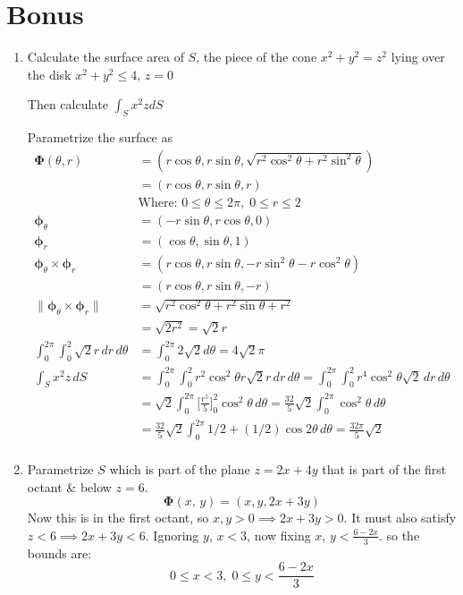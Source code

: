 \documentclass{article}
\newcommand{\norm}[1]{\| #1 \|}
\begin{document}
\section*{Bonus}

\begin{enumerate}[label=(\alph*)]
    \item Calculate the surface area of $S$, the piece of the cone $x^2 + y^2 = z^2$ lying over the disk $x^2 + y^2 \leq 4,\, z=0$
    
    Then calculate $\displaystyle \int_Sx^2zdS$
    
    Parametrize the surface as
    \begin{align*} 
    \boldsymbol \Phi (\theta, r) &= (r\cos \theta, r\sin \theta, \sqrt{r^2\cos^2\theta + r^2\sin^2\theta}) \\
    &= (r\cos \theta, r\sin \theta, r) \\
    &\text{Where: } 0 \leq \theta \leq 2\pi, \; 0 \leq r \leq 2 \\
    \boldsymbol \phi_{\theta} &= (-r\sin \theta, r\cos \theta, 0)\\
    \boldsymbol \phi_{r} &= (\cos \theta, \sin \theta, 1)\\
    \boldsymbol \phi_{\theta} \times \boldsymbol \phi_{r} &= (r\cos\theta, r\sin\theta, -r\sin^2\theta - r\cos^2\theta) \\
    &= (r\cos\theta, r\sin\theta, -r) \\
    \norm{\boldsymbol \phi_{\theta} \times \boldsymbol \phi_{r}} &= \sqrt{r^2\cos^2\theta + r^2\sin\theta + r^2} \\
    &= \sqrt{2r^2} = \sqrt{2}r\\
    \int_0^{2\pi} \int_0^2 \sqrt{2}r \, dr \, d\theta &= \int_0^{2\pi} 2 \sqrt{2} d \theta = 4\sqrt 2 \pi \\
    \int_S x^2 z \, dS \, &= \int_0^{2\pi} \int_0^2 r^2 \cos^2 \theta r\sqrt 2 r \, dr \, d \theta = \int_0^{2\pi} \int_0^2 r^4 \cos^2 \theta \sqrt 2 \, dr \, d \theta \\
    &= \sqrt{2}\int_0^{2\pi} \Big[ \frac{r^5}{5}\Big]_0^2 \cos^2 \theta \, d \theta = \frac{32}{5}\sqrt{2}\int_0^{2\pi}   \cos^2 \theta \, d \theta \\
    &= \frac{32}{5}\sqrt{2}\int_0^{2\pi}   1/2 + (1/2)\cos 2 \theta \, d \theta = \frac{32\pi}{5}\sqrt{2} \\
    \end{align*}
    \item Parametrize $S$ which is part of the plane $z = 2x + 4y$ that is part of the first octant \& below $z = 6$.
    \[ \boldsymbol \Phi (x, \, y) = (x,y,2x+3y) \]
    Now this is in the first octant, so $x,y> 0 \implies 2x+3y > 0$. It must also satisfy $ z < 6 \implies 2x+3y < 6$. Ignoring $y$, $x < 3$, now fixing $x$, $y < \frac{6 - 2x}{3}$. so the bounds are:
    \[ 0 \leq x < 3,\; 0 \leq y < \frac{6-2x}{3} \]


\end{enumerate}
\end{document}
